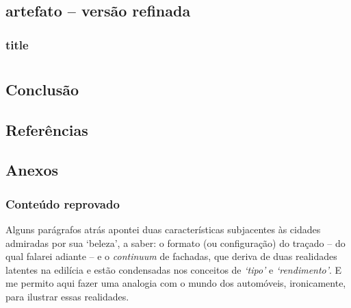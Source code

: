 \documentclass[12pt, a4paper]{book} %
\begin{document}
        \chapter[Diretrizes projetuais]{artefato – versão refinada}

            \section[Comunicação do artefato aos \textit{stakeholders}]{title}


    \part*{}

        \chapter*{Conclusão}

        \chapter*{Referências}


        \chapter*{Anexos}

        \section{Conteúdo reprovado}%
            Alguns parágrafos atrás apontei duas características subjacentes às cidades admiradas por sua `beleza', a saber: o formato (ou configuração) do traçado – do qual falarei adiante – e o \textit{continuum} de fachadas, que deriva de duas realidades latentes na edilícia e estão condensadas nos conceitos de \emph{`tipo'} e \emph{`rendimento'}. E me permito aqui fazer uma analogia com o mundo dos automóveis, ironicamente, para ilustrar essas realidades.
\end{document}
